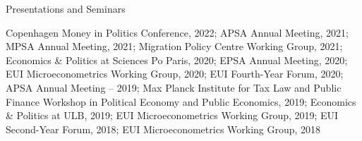 \documentclass{resume} %
\begin{document}




\begin{rSection}  {Presentations and Seminars}  %
	
	
Copenhagen Money in Politics Conference, 2022; APSA Annual Meeting, 2021; MPSA Annual Meeting, 2021; Migration Policy Centre Working Group, 2021; Economics \& Politics at Sciences Po Paris, 2020; EPSA Annual Meeting, 2020;  EUI Microeconometrics Working Group, 2020; EUI Fourth-Year Forum, 2020; APSA Annual Meeting – 2019; Max Planck Institute for Tax Law and Public Finance Workshop in Political Economy and Public Economics, 2019; Economics \& Politics at ULB, 2019; EUI Microeconometrics Working Group, 2019; EUI Second-Year Forum, 2018; EUI Microeconometrics Working Group, 2018

\end{rSection}


%
%

\end{document}
